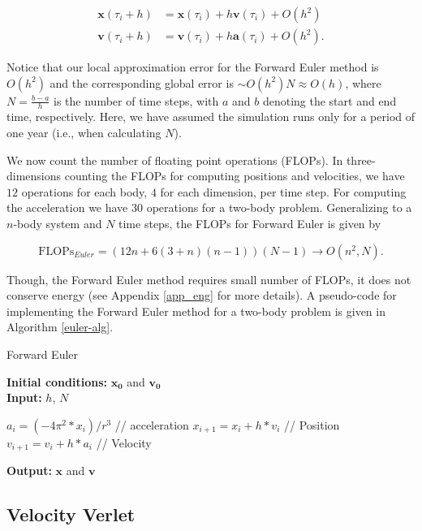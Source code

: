 \documentclass[a4paper]{article}
\begin{document}
\begin{align}
\mathbf{x}(\tau_i + h) &= \mathbf{x}(\tau_i) + h\mathbf{v}(\tau_i) + O(h^{2}) \nonumber \\
\mathbf{v}(\tau_i + h) &= \mathbf{v}(\tau_i) + h\mathbf{a}(\tau_i) + O(h^{2}).
\end{align}

Notice that our local approximation error for the Forward Euler method is $O(h^{2})$ and the corresponding global error is $\sim O(h^{2})N \approx O(h)$, where $N = \frac{b - a}{h} $ is the number of time steps, with $a$ and $b$ denoting the start and end time, respectively. Here, we have assumed the simulation runs only for a period of one year (i.e., when calculating $N$). 

We now count the number of floating point operations (FLOPs). In three-dimensions counting the FLOPs for computing positions and velocities, we have $12$ operations for each body, $4$ for each dimension, per time step. For computing the acceleration we have 30 operations for a two-body problem. Generalizing to a $n$-body system and $N$ time steps, the FLOPs for Forward Euler is given by

\begin{equation}
	\text{FLOPs}_{Euler}=(12n + 6(3 + n)(n - 1))(N-1) \rightarrow O(n^2, N).  \label{flops_euler}
\end{equation}

Though, the Forward Euler method requires small number of FLOPs, it does not conserve energy (see Appendix \ref{app_eng} for more details). A pseudo-code for implementing the Forward Euler method for a two-body problem is given in Algorithm \ref{euler-alg}. 

\begin{algorithm}[H]
\caption{Forward Euler}\label{algo-euler}
\textbf{Initial conditions:} $\mathbf{x_0}$ and $\mathbf{v_0}$ \\
\textbf{Input:} $h$, $N$
\begin{algorithmic}[1]
\State $a_{i} = (-4\pi^2 * x_i) / r^3 $ \qquad// acceleration 
\State $x_{i+1}=x_{i} + h*v_{i}$ \qquad// Position
\State $v_{i+1}=v_{i} + h*a_{i}$ \qquad// Velocity
\EndFor
\EndWhile
\end{algorithmic}
\textbf{Output:} $\mathbf{x}$ and $\mathbf{v}$
\label{euler-alg}
\end{algorithm}

\subsection{Velocity Verlet}
\end{document}

